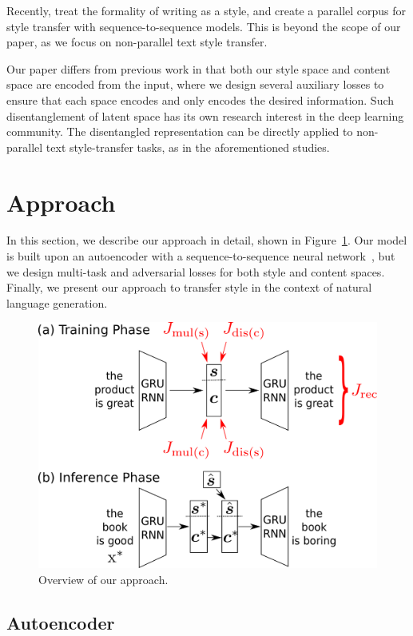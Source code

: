 \documentclass[letterpaper]{article} %
\newcommand{\citeay}[1]{\citeauthor{#1} \shortcite{#1}}
\begin{document}
Recently, \citeay{rao2018dear} treat the formality of writing as a style, and create a parallel corpus for style transfer with sequence-to-sequence models.
This is beyond the scope of our paper, as we focus on non-parallel text style transfer.

Our paper differs from previous work in that both our style space and content space are encoded from the input, where we design several auxiliary losses to ensure that each space encodes and only encodes the desired information.
Such disentanglement of latent space has its own research interest in the deep learning community.
The disentangled representation can be directly applied to non-parallel text style-transfer tasks, as in the aforementioned studies.


\section{Approach}

In this section, we describe our approach in detail, shown in Figure~\ref{fig:overview}.
Our model is built upon an autoencoder with a sequence-to-sequence neural network~\cite{sutskever2014sequence}, but we design multi-task and adversarial losses for both style and content spaces.
Finally, we present our approach to transfer style in the context of natural language generation.

\begin{figure}[!t]
	\centering
	\includegraphics[width=.9\linewidth]{model-overview}
	\caption{Overview of our approach.}
	\label{fig:overview}
\end{figure}

\subsection{Autoencoder} \label{ssec:seq2seq-autoencoder}
\end{document}
